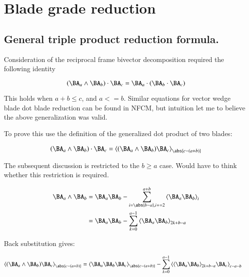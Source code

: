 \chapter{Blade grade reduction}
\label{chap:bladegradereduction}
\date{ Mar 25, 2008.  $RCSfile: bladegradereduction.tex,v $ Last $Revision: 1.10 $ $Date: 2009/06/14 17:59:59 $ }

\section{General triple product reduction formula. }

Consideration of the reciprocal frame bivector decomposition required the following identity

\begin{equation}
(\BA_a \wedge \BA_b) \cdot \BA_c =
\BA_a \cdot (\BA_b \cdot \BA_c)
\end{equation}

This holds when $a + b \le c$, and $a <= b$.  Similar equations for vector wedge blade dot blade reduction can be found in NFCM, but intuition let me to believe the above generalization was valid.

To prove this use the definition of the generalized dot product of two blades:

\begin{align*}
(\BA_a \wedge \BA_b) \cdot \BA_c
&= \gpgrade{ (\BA_a \wedge \BA_b) \BA_c }{\abs{c-(a+b)}} \\
\end{align*}

The subsequent discussion 
is restricted to the $b \ge a$ case.  Would have to think whether this restriction is required.

\begin{align*}\label{eqn:bladegradereduction:bladewedge}
\BA_a \wedge \BA_b 
&= \BA_a \BA_b - \sum_{i=\abs{b-a},i+=2}^{a+b}\gpgrade{\BA_a\BA_b}{i} \\
&= \BA_a \BA_b - \sum_{k=0}^{a-1}\gpgrade{\BA_a\BA_b}{2k + b - a} \\
\end{align*}

Back substitution gives:

\begin{align*}
\gpgrade{ (\BA_a \wedge \BA_b) \BA_c }{\abs{c-(a+b)}} 
&=
\gpgrade{ \BA_a \BA_b \BA_c }{\abs{c-(a+b)}} 
-
\sum_{k=0}^{a-1}
\gpgrade{ \gpgrade{\BA_a\BA_b}{2k + b - a} \BA_c }{c-a-b}
\end{align*}

